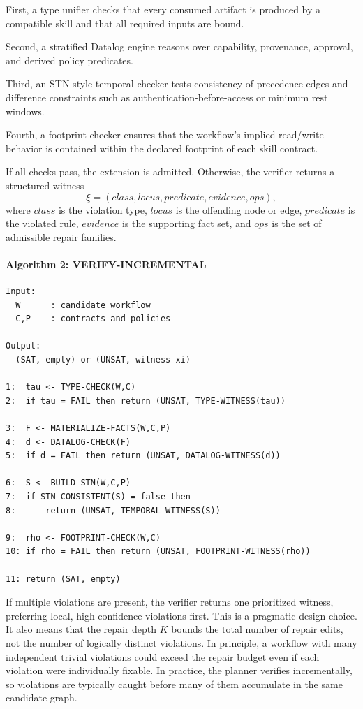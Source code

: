 \documentclass[11pt]{article}
\begin{document}
First, a type unifier checks that every consumed artifact is produced by a compatible skill and that all required inputs are bound.

Second, a stratified Datalog engine reasons over capability, provenance, approval, and derived policy predicates.

Third, an STN-style temporal checker tests consistency of precedence edges and difference constraints such as authentication-before-access or minimum rest windows.

Fourth, a footprint checker ensures that the workflow's implied read/write behavior is contained within the declared footprint of each skill contract.

If all checks pass, the extension is admitted. Otherwise, the verifier returns a structured witness
\[
\xi=(class,locus,predicate,evidence,ops),
\]
where $class$ is the violation type, $locus$ is the offending node or edge, $predicate$ is the violated rule, $evidence$ is the supporting fact set, and $ops$ is the set of admissible repair families.

\paragraph{Algorithm 2: VERIFY-INCREMENTAL}
\begin{verbatim}
Input:
  W      : candidate workflow
  C,P    : contracts and policies

Output:
  (SAT, empty) or (UNSAT, witness xi)

1:  tau <- TYPE-CHECK(W,C)
2:  if tau = FAIL then return (UNSAT, TYPE-WITNESS(tau))

3:  F <- MATERIALIZE-FACTS(W,C,P)
4:  d <- DATALOG-CHECK(F)
5:  if d = FAIL then return (UNSAT, DATALOG-WITNESS(d))

6:  S <- BUILD-STN(W,C,P)
7:  if STN-CONSISTENT(S) = false then
8:      return (UNSAT, TEMPORAL-WITNESS(S))

9:  rho <- FOOTPRINT-CHECK(W,C)
10: if rho = FAIL then return (UNSAT, FOOTPRINT-WITNESS(rho))

11: return (SAT, empty)
\end{verbatim}

If multiple violations are present, the verifier returns one prioritized witness, preferring local, high-confidence violations first. This is a pragmatic design choice. It also means that the repair depth $K$ bounds the total number of repair edits, not the number of logically distinct violations. In principle, a workflow with many independent trivial violations could exceed the repair budget even if each violation were individually fixable. In practice, the planner verifies incrementally, so violations are typically caught before many of them accumulate in the same candidate graph.
\end{document}
